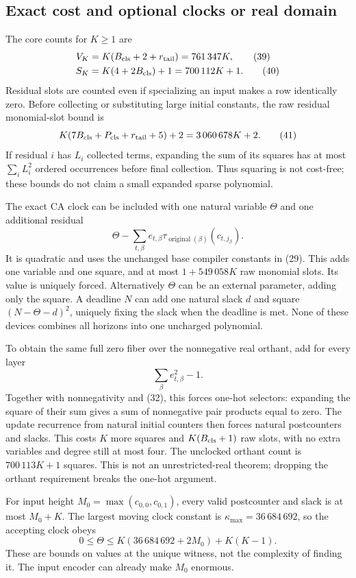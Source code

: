 \documentclass[11pt,a4paper]{article}
\numberwithin{equation}{section}
\begin{document}
\subsection{Exact cost and optional clocks or real domain}
The core counts for $K\ge1$ are
\begin{align}
 V_K&=K(B_{\rm cls}+2+r_{\rm tail})=761\,347K,           \tag{39}\\
 S_K&=K(4+2B_{\rm cls})+1=700\,112K+1.                \tag{40}
\end{align}
Residual slots are counted even if specializing an input makes a row
identically zero. Before collecting or substituting large initial constants,
the raw residual monomial-slot bound is
\[
 K(7B_{\rm cls}+P_{\rm cls}+r_{\rm tail}+5)+2
                         =3\,060\,678K+2.             \tag{41}
\]
If residual $i$ has $L_i$ collected terms, expanding the sum of its squares
has at most $\sum_iL_i^2$ ordered occurrences before final collection. Thus
squaring is not cost-free; these bounds do not claim a small expanded sparse
polynomial.

The exact CA clock can be included with one natural variable $\Theta$ and
one additional residual
\[
  \Theta-\sum_{t,\beta}e_{t,\beta}
            \tau_{\operatorname{original}(\beta)}(c_{t,j_\beta}).\tag{42}
\]
It is quadratic and uses the unchanged base compiler constants in (29).
This adds one variable and one square, and at most $1+549\,058K$ raw monomial
slots. Its value is uniquely forced. Alternatively $\Theta$ can be an
external parameter, adding only the square. A deadline $N$ can add one
natural slack $d$ and square $(N-\Theta-d)^2$, uniquely fixing the slack
when the deadline is met. None of these devices combines all horizons into
one uncharged polynomial.

To obtain the same full zero fiber over the nonnegative real orthant, add
for every layer
\[
                            \sum_\beta e_{t,\beta}^2-1.\tag{43}
\]
Together with nonnegativity and (32), this forces one-hot selectors: expanding
the square of their sum gives a sum of nonnegative pair products equal to
zero. The update recurrence from natural initial counters then forces natural
postcounters and slacks. This costs $K$ more squares and
$K(B_{\rm cls}+1)$ raw slots, with no extra variables and degree still at
most four. The unclocked orthant count is $700\,113K+1$ squares. This is not
an unrestricted-real theorem; dropping the orthant requirement breaks the
one-hot argument.

For input height $M_0=\max(c_{0,0},c_{0,1})$, every valid postcounter and
slack is at most $M_0+K$. The largest moving clock constant is
$\kappa_{\max}=36\,684\,692$, so the accepting clock obeys
\[
 0\le\Theta\le K(36\,684\,692+2M_0)+K(K-1).            \tag{44}
\]
These are bounds on values at the unique witness, not the complexity of
finding it. The input encoder can already make $M_0$ enormous.
\end{document}
